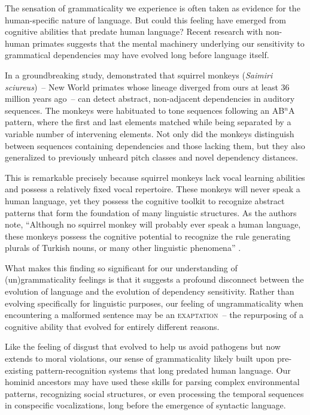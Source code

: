 The sensation of grammaticality we experience is often taken as evidence for the human-specific nature of language. But could this feeling have emerged from cognitive abilities that predate human language? Recent research with non-human primates suggests that the mental machinery underlying our sensitivity to grammatical dependencies may have evolved long before language itself.

In a groundbreaking study, \citet{Ravignani2013} demonstrated that squirrel monkeys (\textit{Saimiri sciureus})~-- New World primates whose lineage diverged from ours at least 36 million years ago~-- can detect abstract, non-adjacent dependencies in auditory sequences. The monkeys were habituated to tone sequences following an AB$^n$A pattern, where the first and last elements matched while being separated by a variable number of intervening elements. Not only did the monkeys distinguish between sequences containing dependencies and those lacking them, but they also generalized to previously unheard pitch classes and novel dependency distances.

This is remarkable precisely because squirrel monkeys lack vocal learning abilities and possess a relatively fixed vocal repertoire. These monkeys will never speak a human language, yet they possess the cognitive toolkit to recognize abstract patterns that form the foundation of many linguistic structures. As the authors note, ``Although no squirrel monkey will probably ever speak a human language, these monkeys possess the cognitive potential to recognize the rule generating plurals of Turkish nouns, or many other linguistic phenomena'' \citep[4]{Ravignani2013}.

What makes this finding so significant for our understanding of (un)gram\-maticality feelings is that it suggests a profound disconnect between the evolution of language and the evolution of dependency sensitivity. Rather than evolving specifically for linguistic purposes, our feeling of ungrammaticality when encountering a malformed sentence may be an \textsc{exaptation}~-- the repurposing of a cognitive ability that evolved for entirely different reasons.

Like the feeling of disgust that evolved to help us avoid pathogens but now extends to moral violations, our sense of grammaticality likely built upon pre-existing pattern-recognition systems that long predated human language. Our hominid ancestors may have used these skills for parsing complex environmental patterns, recognizing social structures, or even processing the temporal sequences in conspecific vocalizations, long before the emergence of syntactic language.

